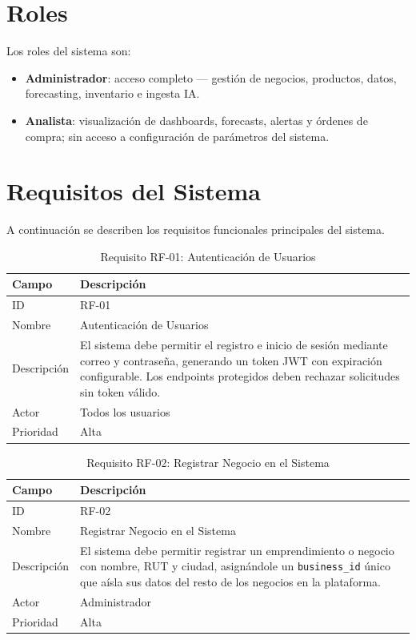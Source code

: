 \documentclass[12pt, a4paper]{report}
\begin{document}
\section{Roles}

Los roles del sistema son:

\begin{itemize}
  \item \textbf{Administrador}: acceso completo — gestión de negocios, productos,
        datos, forecasting, inventario e ingesta IA.
  \item \textbf{Analista}: visualización de dashboards, forecasts, alertas y órdenes
        de compra; sin acceso a configuración de parámetros del sistema.
\end{itemize}

\section{Requisitos del Sistema}

A continuación se describen los requisitos funcionales principales del sistema.

\begin{table}[H]
  \centering
  \caption{Requisito RF-01: Autenticación de Usuarios}
  \label{tab:rf01}
  \begin{tabular}{|l|p{9cm}|}
    \hline
    \textbf{Campo} & \textbf{Descripción} \\
    \hline
    ID          & RF-01 \\
    Nombre      & Autenticación de Usuarios \\
    Descripción & El sistema debe permitir el registro e inicio de sesión mediante
                  correo y contraseña, generando un token JWT con expiración configurable.
                  Los endpoints protegidos deben rechazar solicitudes sin token válido. \\
    Actor       & Todos los usuarios \\
    Prioridad   & Alta \\
    \hline
  \end{tabular}
\end{table}

\begin{table}[H]
  \centering
  \caption{Requisito RF-02: Registrar Negocio en el Sistema}
  \label{tab:rf02}
  \begin{tabular}{|l|p{9cm}|}
    \hline
    \textbf{Campo} & \textbf{Descripción} \\
    \hline
    ID          & RF-02 \\
    Nombre      & Registrar Negocio en el Sistema \\
    Descripción & El sistema debe permitir registrar un emprendimiento o negocio con
                  nombre, RUT y ciudad, asignándole un \texttt{business\_id} único que
                  aísla sus datos del resto de los negocios en la plataforma. \\
    Actor       & Administrador \\
    Prioridad   & Alta \\
    \hline
  \end{tabular}
\end{table}
\end{document}

